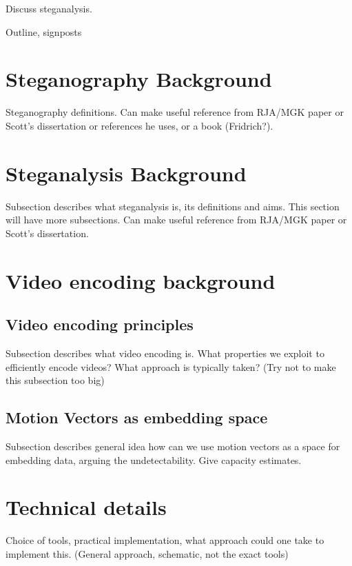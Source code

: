 \documentclass[12pt,british,twoside,notitlepage,usenames,dvipsnames,hypens,final]{report}
\numberwithin{equation}{section}
\numberwithin{figure}{section}
\begin{document}
Discuss steganalysis.


Outline, signposts

\section{Steganography Background}

Steganography definitions. Can make useful reference from RJA/MGK paper or Scott's dissertation or references he uses, or a book (Fridrich?). 

\section{Steganalysis Background}

Subsection describes what steganalysis is, its definitions and aims. This section will have more subsections. Can make useful reference from RJA/MGK paper or Scott's dissertation. 

\section{Video encoding background}

\subsection{Video encoding principles}

Subsection describes what video encoding is. What properties we exploit to efficiently encode videos? What approach is typically taken? (Try not to make this subsection too big)

\subsection{Motion Vectors as embedding space}

Subsection describes general idea how can we use motion vectors as a space for embedding data, arguing the undetectability. Give capacity estimates.

\section{Technical details}

Choice of tools, practical implementation, what approach could one take to implement this. (General approach, schematic, not the exact tools)
\end{document}

